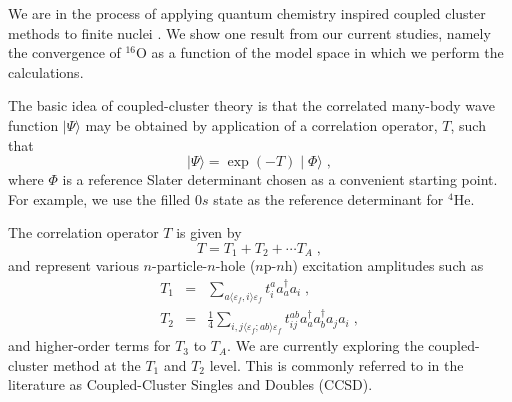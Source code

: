 \documentclass{article}
\begin{document}
We are in the process of applying quantum chemistry inspired coupled cluster
methods
\cite{comp_chem_rev00,cizek66,Bartlett95,Paldus99,Piecuch02a,Piecuch02b,cizek69,Stanton:1993,Piecuch99} to
finite nuclei \cite{dean03,kowalski03n}. We show one result
from our current studies, namely the convergence of $^{16}$O
as a function of the model space in which we perform the calculations.

The basic idea of coupled-cluster theory is that the correlated many-body
wave function $\mid \Psi\rangle$ 
may be obtained by application of a correlation operator, 
$T$, such that
\begin{equation}
\mid\Psi \rangle =\exp\left(-T\right)\mid\Phi\rangle\;,
\end{equation}
where $\Phi$ is a reference Slater determinant chosen as a convenient starting
point.  For example, we use the filled $0s$ state as the reference 
determinant for $^4$He.

The correlation operator $T$ is given by
\begin{equation}
T=T_1 + T_2 + \cdots T_A\;,
\end{equation}
and represent various
$n$-particle-$n$-hole ($n$p-$n$h) excitation amplitudes such as
\begin{eqnarray}
T_1 &=& \sum_{a\langle\varepsilon_f, i\rangle\varepsilon_f}t^a_i a^\dagger_a a_i\;, \\
T_2 &=& \frac{1}{4}\sum_{i,j\langle\varepsilon_f; ab \rangle \varepsilon_f}t^{ab}_{ij}
a^\dagger_a a^\dagger_b a_j a_i\;,
\end{eqnarray}
and higher-order terms for $T_3$ to $T_A$.  
We are currently exploring
the coupled-cluster method at the $T_1$ and $T_2$ level. This is 
commonly referred to in the literature as Coupled-Cluster Singles and
Doubles (CCSD). 
\end{document}

